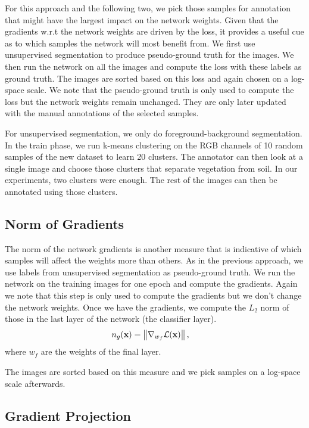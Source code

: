 \documentclass[letterpaper, 10 pt, conference]{ieeeconf}  %
\begin{document}
For this approach and the following two, we pick those samples for annotation that might have the largest impact on the network weights. Given that the gradients w.r.t the network weights are driven by the loss, it provides a useful cue as to which samples the network will most benefit from. We first use unsupervised segmentation to produce pseudo-ground truth for the images. We then run the network on all the images and compute the loss with these labels as ground truth. The images are sorted based on this loss and again chosen on a log-space scale. We note that the pseudo-ground truth is only used to compute the loss but the network weights remain unchanged. They are only later updated with the manual annotations of the selected samples.

For unsupervised segmentation, we only do foreground-background segmentation. In the train phase, we run k-means clustering on the RGB channels of 10 random samples of the new dataset to learn 20 clusters. The annotator can then look at a single image and choose those clusters that separate vegetation from soil. In our experiments, two clusters were enough. The rest of the images can then be annotated using those clusters. 


\subsection{Norm of Gradients} \label{sec:grad_norm}

The norm of the network gradients is another measure that is indicative of which samples will affect the weights more than others. As in the previous approach, we use labels from unsupervised segmentation as pseudo-ground truth. We run the network on the training images for one epoch and compute the gradients. Again we note that this step is only used to compute the gradients but we don't change the network weights. Once we have the gradients, we compute the $L_2$ norm of those in the last layer of the network (the classifier layer).
\begin{align}
n_g(\bold{x}) &=  \left\lVert \nabla_{w_f} \mathcal{L}(\bold{x}) \right\rVert,
\end{align}  
where $w_f$ are the weights of the final layer.

The images are sorted based on this measure and we pick samples on a log-space scale afterwards.

\subsection{Gradient Projection} \label{sec:grad_proj}
\end{document}
